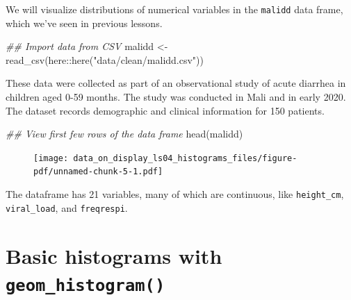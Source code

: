 \documentclass[
  letterpaper,
  DIV=11,
  numbers=noendperiod]{scrreprt}
\newenvironment{Shaded}{\begin{snugshade}}{\end{snugshade}}
\newcommand{\DocumentationTok}[1]{\textcolor[rgb]{0.37,0.37,0.37}{\textit{#1}}}
\newcommand{\FunctionTok}[1]{\textcolor[rgb]{0.28,0.35,0.67}{#1}}
\newcommand{\NormalTok}[1]{\textcolor[rgb]{0.00,0.23,0.31}{#1}}
\newcommand{\OtherTok}[1]{\textcolor[rgb]{0.00,0.23,0.31}{#1}}
\newcommand{\SpecialCharTok}[1]{\textcolor[rgb]{0.37,0.37,0.37}{#1}}
\newcommand{\StringTok}[1]{\textcolor[rgb]{0.13,0.47,0.30}{#1}}
\begin{document}
We will visualize distributions of numerical variables in the
\texttt{malidd} data frame, which we've seen in previous lessons.

\begin{Shaded}
\begin{Highlighting}[]
\DocumentationTok{\#\# Import data from CSV}
\NormalTok{malidd }\OtherTok{\textless{}{-}} \FunctionTok{read\_csv}\NormalTok{(here}\SpecialCharTok{::}\FunctionTok{here}\NormalTok{(}\StringTok{"data/clean/malidd.csv"}\NormalTok{))}
\end{Highlighting}
\end{Shaded}

\begin{tcolorbox}[enhanced jigsaw, colframe=quarto-callout-note-color-frame, rightrule=.15mm, opacityback=0, breakable, coltitle=black, colbacktitle=quarto-callout-note-color!10!white, bottomrule=.15mm, leftrule=.75mm, toprule=.15mm, arc=.35mm, bottomtitle=1mm, colback=white, left=2mm, opacitybacktitle=0.6, titlerule=0mm, title=\textcolor{quarto-callout-note-color}{\faInfo}\hspace{0.5em}{Recap}, toptitle=1mm]

These data were collected as part of an observational study of acute
diarrhea in children aged 0-59 months. The study was conducted in Mali
and in early 2020. The dataset records demographic and clinical
information for 150 patients.

\end{tcolorbox}

\begin{Shaded}
\begin{Highlighting}[]
\DocumentationTok{\#\# View first few rows of the data frame}
\FunctionTok{head}\NormalTok{(malidd)}
\end{Highlighting}
\end{Shaded}

\begin{figure}[H]

{\centering \texttt{[image: data\_on\_display\_ls04\_histograms\_files/figure-pdf/unnamed-chunk-5-1.pdf]}

}

\end{figure}

The dataframe has 21 variables, many of which are continuous, like
\texttt{height\_cm}, \texttt{viral\_load}, and \texttt{freqrespi}.

\hypertarget{basic-histograms-with-geom_histogram}{%
\section{\texorpdfstring{Basic histograms with
\texttt{geom\_histogram()}}{Basic histograms with geom\_histogram()}}\label{basic-histograms-with-geom_histogram}}
\end{document}
